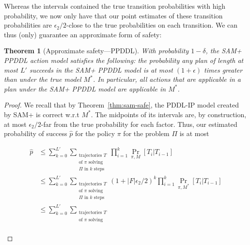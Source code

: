 \documentclass[letterpaper]{article} %
\newtheorem{theorem}{Theorem}
\begin{document}
Whereas the intervals contained the true transition probabilities with high probability, we now only have that our point estimates of these transition probabilities are $\epsilon_2/2$-close to the true probabilities on each transition. We can thus (only) guarantee an approximate form of safety:
\begin{theorem}[Approximate safety---PPDDL]
\label{thm:ppddl-sam-safe}
With probability $1-\delta$, the SAM+ PPDDL action model satisfies the following:
the probability any plan of length at most $L'$ succeeds in the SAM+ PPDDL model is at most $(1+\epsilon)$ times greater than under the true model $M^*$. In particular, all actions that are applicable in a plan under the SAM+ PPDDL model are applicable in $M^*$.
\end{theorem}
\begin{proof}
We recall that by Theorem~\ref{thm:sam-safe}, 
the PDDL-IP model created by SAM+ is correct w.r.t $M^*$. 
The midpoints of its intervals are, by construction, at most $\epsilon_2/2$-far from the true probability for each factor. Thus, our estimated probability of success $\hat{p}$ for the policy $\pi$ for the problem $\Pi$ is at most
\begin{small}
\begin{align*}
\hat{p} &\leq 
\sum_{k=0}^{L'}\sum_{\substack{\text{trajectories }T\\\text{of }\pi\text{ solving}\\
\Pi\text{ in }k\text{ steps}}}\prod_{i=1}^k\Pr_{\pi,M}[T_i|T_{i-1}]\\
&\leq \sum_{k=0}^{L'}\sum_{\substack{\text{trajectories }T\\\text{of }\pi\text{ solving}\\\Pi\text{ in }k\text{ steps}}}(1+|F|\epsilon_2/2)^k\prod_{i=1}^k\Pr_{\pi,M^*}[T_i|T_{i-1}]\\
&\leq \sum_{k=0}^{L'}\sum_{\substack{\text{trajectories }T\\\text{of }\pi\text{ solving}\\
}}
\end{align*}
\end{small}
\end{proof}
\end{document}

